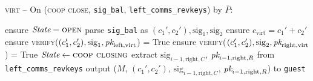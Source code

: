 \begin{center}
  \begin{processbox}{\textsc{virt} -- On (\textsc{coop close},
  \texttt{sig\_bal}, \texttt{left\_comms\_revkeys}) by $\bar{P}$:}
    \begin{algorithmic}[1]
      \State ensure $\itistate = \textsc{open}$
      \State parse \texttt{sig\_bal} as $(c_1', c_2'), \mathrm{sig}_1,
      \mathrm{sig}_2$
      \State ensure $c_{\mathrm{virt}} = c_1' + c_2'$
      \State ensure \textsc{verify}($(c_1', c_2'), \mathrm{sig}_1,
      \textit{pk}_{\mathrm{left}, \mathrm{virt}}$) = True
      \State ensure \textsc{verify}($(c_1', c_2'), \mathrm{sig}_2,
      \textit{pk}_{\mathrm{right}, \mathrm{virt}}$) = True
      \State $\itistate \gets \textsc{coop closing}$
      \State extract $\mathrm{sig}_{i-1, \mathrm{right}, C}$, $\textit{pk}_{i-1,
      \mathrm{right}, R}$ from \texttt{left\_comms\_revkeys}
      \State output ($M$, $(c_1', c_2')$, $\mathrm{sig}_{i-1, \mathrm{right}, C}$,
      $\textit{pk}_{i-1, \mathrm{right}, R}$) to \texttt{guest}
      \label{code:virtual-layer:coop-close-intermediary:first-invoke-guest}
      \State {} 
      \label{code:virtual-layer:coop-close-intermediary:first-activation-guest}
      \State {}
      \label{code:virtual-layer:coop-close-intermediary:guest-state-change}
      \State {} 
      \State {}
      \State {}
      \label{code:virtual-layer:coop-close-intermediary:left-old-fund-keys}
      \State {}
      \label{code:virtual-layer:coop-close-intermediary:left-interm-comm}
      \State {}

\end{algorithmic}
\end{processbox}
\end{center}
